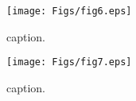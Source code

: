 \begin{figure}[h]
	\begin{center}
	\texttt{[image: Figs/fig6.eps]} 
	\end{center}
	\caption{
		caption.
	} 
	\label{fig:fig6}
\end{figure}
\begin{figure}[h]
	\begin{center}
	\texttt{[image: Figs/fig7.eps]} 
	\end{center}
	\caption{
		caption.
	} 
	\label{fig:fig7}
\end{figure}

